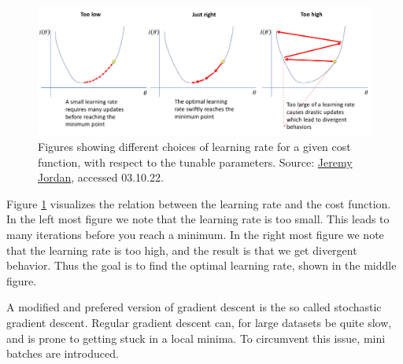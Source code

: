\begin{figure}
    \includegraphics[width=\linewidth]{Figures/Machinelearning/lr_choice.png}
    \caption[Explaining concequence of choice of learning rate]{Figures showing different choices of learning rate for a given cost function, with respect to the tunable parameters. 
    Source: \href{https://www.jeremyjordan.me/content/images/2018/02/Screen-Shot-2018-02-24-at-11.47.09-AM.png}{Jeremy Jordan}, accessed 03.10.22.}
    \label{fig:lr_choice}
\end{figure}

Figure \ref{fig:lr_choice} visualizes the relation between the learning rate and the cost function. In the left most figure we note that the learning rate is too small. 
This leads to many iterations before you reach a minimum. In the right most figure we note that the learning rate is too high, and the result is that we get divergent behavior. 
Thus the goal is to find the optimal learning rate, shown in the middle figure. \par 
A modified and prefered version of gradient descent is the so called stochastic gradient descent. Regular gradient descent can, for large datasets be quite slow, and is prone to 
getting stuck in a local minima. To circumvent this issue, mini batches are introduced. 




